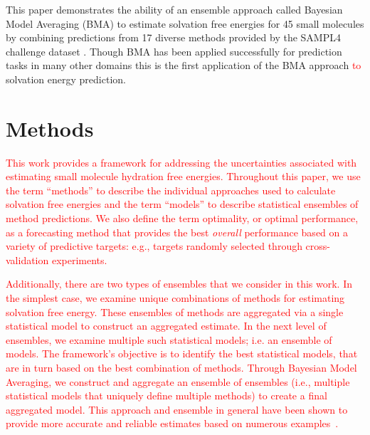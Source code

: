 \documentclass[journal=jpcbfk, manuscript=article]{achemso}
\newcommand{\+}[1]{\ensuremath{\mathbf{#1}}}
\newcommand{\rev}[1]{\textsf{\textcolor{red}{#1}}}
\begin{document}
This paper demonstrates the ability of an ensemble approach called Bayesian Model Averaging (BMA) \cite{Hoeting:1999} to estimate solvation free energies for 45 small molecules by combining predictions from 17 diverse methods provided by the SAMPL4 challenge dataset \cite{Mobley:2014}.
Though BMA has been applied successfully for prediction tasks in many other domains \cite{Ye:2004, Vlachopoulo:2013, Raftery:2005, Morales-Casique:2010, Gosink:2014} this is the first application of the BMA approach \rev{to} solvation energy prediction.

\section{Methods} \label{MethodMain}
\rev{This work provides a framework for addressing the uncertainties associated with estimating  small molecule hydration free energies. 
Throughout this paper, we use the term ``methods'' to describe the individual approaches used to calculate solvation free energies and the term ``models'' to describe statistical ensembles of method predictions.  
We also define the term optimality, or optimal performance, as a forecasting method that provides the best \emph{overall} performance based on a variety of predictive targets: e.g., targets randomly selected through cross-validation experiments.}

\rev{Additionally, there are two types of ensembles that we consider in this work.
In the simplest case, we examine unique combinations of methods for estimating solvation free energy.
These ensembles of methods are aggregated via a single statistical model to construct an aggregated estimate. 
In the next level of ensembles, we examine multiple such statistical models; i.e. an ensemble of models. 
The framework's objective is to identify the best statistical models, that are in turn based on the best combination of methods.
Through Bayesian Model Averaging, we construct and aggregate an ensemble of ensembles (i.e., multiple statistical models that uniquely define multiple methods) to create a final aggregated model.
This approach and ensemble in general have been shown to provide more accurate and reliable estimates based on numerous examples~\cite{Gosink:2014, Zhang:2003, Bates:1969, Morales-Casique:2010, Opitz:1999, Rokach:2010, Hoeting:1999, Seni:2010, Raftery:2005, Vlachopoulo:2013, Seni:2010, Hoeting:1999, Raftery:1998, Raftery:1995}.}
\end{document}
